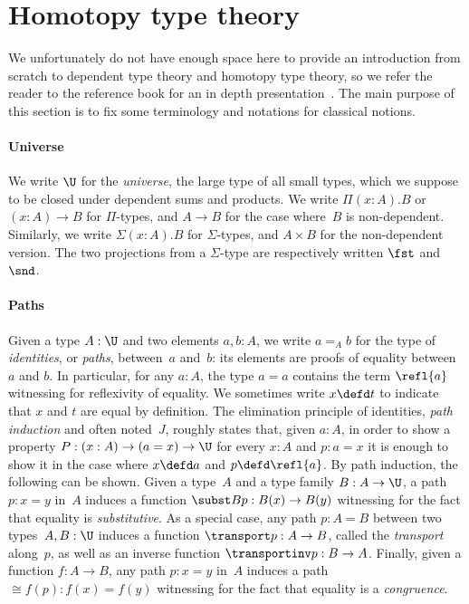 \section{Homotopy type theory}
\label{hott}
We unfortunately do not have enough space here to provide an introduction from
scratch to dependent type theory and homotopy type theory, so we refer the reader
to the reference book for an in depth presentation~\cite{hottbook}. The main
purpose of this section is to fix some terminology and notations for classical
notions.

\paragraph{Universe}
We write $\U$ for the \emph{universe}, \ie the large type of all small types,
which we suppose to be closed under dependent sums and products. We write
$\Pi(x:A).B$ or $(x:A)\to B$ for $\Pi$-types, and $A\to B$ for the case
where~$B$ is non-dependent. Similarly, we write $\Sigma(x:A).B$ for
$\Sigma$-types, and $A\times B$ for the non-dependent version. The two
projections from a $\Sigma$-type are respectively written $\fst$ and $\snd$.

\paragraph{Paths}
Given a type $A:\U$ and two elements $a,b:A$, we write $a=_A b$ for the type of
\emph{identities}, or \emph{paths}, between~$a$ and~$b$: its elements are proofs
of equality between $a$ and $b$. In particular, for any $a:A$, the type $a=a$
contains the term $\refl{a}$ witnessing for reflexivity of
equality.
%
We sometimes write $x\defd t$ to indicate that $x$ and $t$ are equal by
definition.
%
The elimination principle of identities, \aka \emph{path induction} and often
noted~$J$, roughly states that, given $a:A$, in order to show a property
$P:(x:A)\to(a=x)\to\U$ for every $x:A$ and $p:a=x$ it is enough to show it in
the case where $x\defd a$ and $p\defd\refl{a}$.
%
%
By path induction, the following can be shown. Given a type~$A$ and a type
family $B:A\to\U$, a path $p:x=y$ in~$A$ induces a function
$\subst Bp:B(x)\to B(y)$ witnessing for the fact that equality is
\emph{substitutive}. As a special case, any path $p:A=B$ between two
types~$A,B:\U$ induces a function $\transport p:A\to B$, called the
\emph{transport} along~$p$, as well as an inverse function
$\transportinv p:B\to A$. Finally, given a function $f:A\to B$, any path $p:x=y$
in~$A$ induces a path $\cong f(p): f(x) = f(y)$ witnessing for the fact that
equality is a \emph{congruence}.

